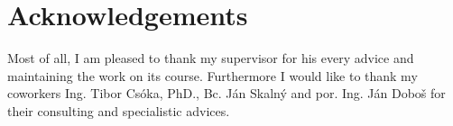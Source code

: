 \thispagestyle{empty}
\section*{Acknowledgements}

Most of all, I am pleased to thank my supervisor for his every advice and maintaining the work on its course. Furthermore I would like to thank my coworkers Ing. Tibor Csóka, PhD., Bc. Ján Skalný and por. Ing. Ján Doboš for their consulting and specialistic advices. 

\newpage
\thispagestyle{empty}
\mbox{}
\newpage